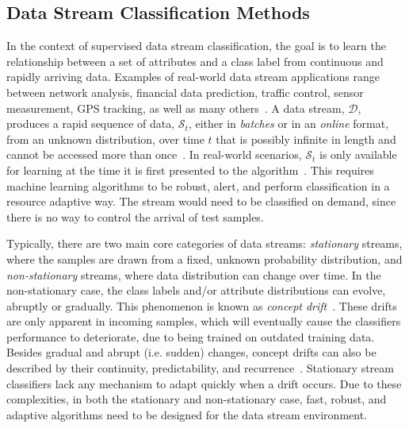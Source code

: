 \documentclass[reqno]{vcuthesis}
\newcommand{\proc}{{\mathcal D}}
\numberwithin{equation}{chapter}
\begin{document}
\subsection{Data Stream Classification Methods}
In the context of supervised data stream classification, the goal is to learn the relationship between a set of attributes and a class label from continuous and rapidly arriving data. Examples of real-world data stream applications range between network analysis, financial data prediction, traffic control, sensor measurement, GPS tracking, as well as many others~\cite{moacite,gaber2007survey,krawczyk2017ensemble,li2015data}. A data stream, $\proc$, produces a rapid sequence of data, $\mathcal{S}_t$, either in \textit{batches} or in an \textit{online} format, from an unknown distribution, over time $t$ that is possibly infinite in length and cannot be accessed more than once~\cite{zang2014comparative}. In real-world scenarios, $\mathcal{S}_t$ is only available for learning at the time it is first presented to the algorithm~\cite{bifet2009new}. This requires machine learning algorithms to be robust, alert, and perform classification in a resource adaptive way. The stream would need to be classified on demand, since there is no way to control the arrival of test samples. 

Typically, there are two main core categories of data streams: \textit{stationary} streams, where the samples are drawn from a fixed, unknown probability distribution, and \textit{non-stationary} streams, where data distribution can change over time. In the non-stationary case, the class labels and/or attribute distributions can evolve, abruptly or gradually. This phenomenon is known as \textit{concept drift}~\cite{gama2014survey}. These drifts are only apparent in incoming samples, which will eventually cause the classifiers performance to deteriorate, due to being trained on outdated training data. Besides gradual and abrupt (i.e. sudden) changes, concept drifts can also be described by their continuity, predictability, and recurrence~\cite{krawczyk2017ensemble,webb2016characterizing}. Stationary stream classifiers lack any mechanism to adapt quickly when a drift occurs. Due to these complexities, in both the stationary and non-stationary case, fast, robust, and adaptive algorithms need to be designed for the data stream environment. 
\end{document}
